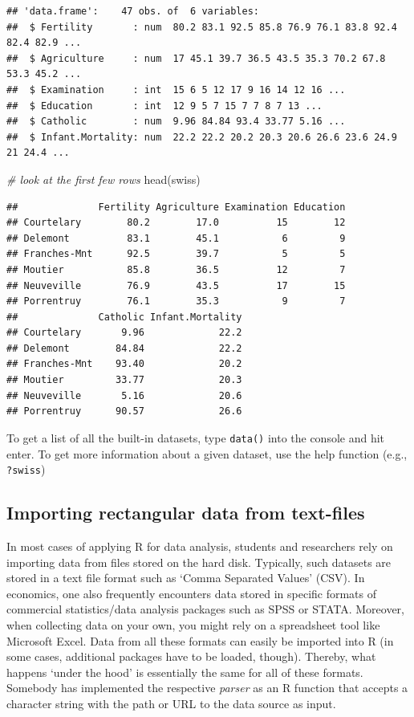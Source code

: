 \documentclass[
  12pt,
]{style/krantz}
\newenvironment{Shaded}{\begin{snugshade}}{\end{snugshade}}
\newcommand{\CommentTok}[1]{\textcolor[rgb]{0.56,0.35,0.01}{\textit{#1}}}
\newcommand{\FunctionTok}[1]{\textcolor[rgb]{0.00,0.00,0.00}{#1}}
\newcommand{\NormalTok}[1]{#1}
\begin{document}
\begin{verbatim}
## 'data.frame':    47 obs. of  6 variables:
##  $ Fertility       : num  80.2 83.1 92.5 85.8 76.9 76.1 83.8 92.4 82.4 82.9 ...
##  $ Agriculture     : num  17 45.1 39.7 36.5 43.5 35.3 70.2 67.8 53.3 45.2 ...
##  $ Examination     : int  15 6 5 12 17 9 16 14 12 16 ...
##  $ Education       : int  12 9 5 7 15 7 7 8 7 13 ...
##  $ Catholic        : num  9.96 84.84 93.4 33.77 5.16 ...
##  $ Infant.Mortality: num  22.2 22.2 20.2 20.3 20.6 26.6 23.6 24.9 21 24.4 ...
\end{verbatim}

\begin{Shaded}
\begin{Highlighting}[]
\CommentTok{\# look at the first few rows}
\FunctionTok{head}\NormalTok{(swiss)}
\end{Highlighting}
\end{Shaded}

\begin{verbatim}
##              Fertility Agriculture Examination Education
## Courtelary        80.2        17.0          15        12
## Delemont          83.1        45.1           6         9
## Franches-Mnt      92.5        39.7           5         5
## Moutier           85.8        36.5          12         7
## Neuveville        76.9        43.5          17        15
## Porrentruy        76.1        35.3           9         7
##              Catholic Infant.Mortality
## Courtelary       9.96             22.2
## Delemont        84.84             22.2
## Franches-Mnt    93.40             20.2
## Moutier         33.77             20.3
## Neuveville       5.16             20.6
## Porrentruy      90.57             26.6
\end{verbatim}

To get a list of all the built-in datasets, type \texttt{data()} into the console and hit enter. To get more information about a given dataset, use the help function (e.g., \texttt{?swiss})

\hypertarget{importing-rectangular-data-from-text-files}{%
\subsection{Importing rectangular data from text-files}\label{importing-rectangular-data-from-text-files}}

In most cases of applying R for data analysis, students and researchers rely on importing data from files stored on the hard disk. Typically, such datasets are stored in a text file format such as `Comma Separated Values' (CSV). In economics, one also frequently encounters data stored in specific formats of commercial statistics/data analysis packages such as SPSS or STATA. Moreover, when collecting data on your own, you might rely on a spreadsheet tool like Microsoft Excel. Data from all these formats can easily be imported into R (in some cases, additional packages have to be loaded, though). Thereby, what happens `under the hood' is essentially the same for all of these formats. Somebody has implemented the respective \emph{parser} as an R function that accepts a character string with the path or URL to the data source as input.
\end{document}

